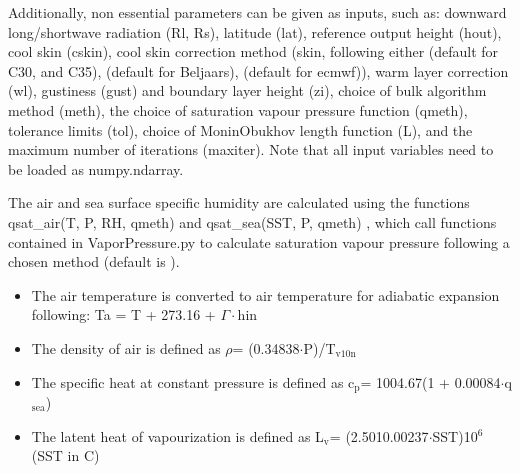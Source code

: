 \documentclass[letterpaper,10pt,english]{sphinxmanual}
\begin{document}
\sphinxAtStartPar
Additionally, non essential parameters can be given as inputs, such as: downward long/shortwave radiation (Rl, Rs), latitude (lat), reference output height (hout),  cool skin (cskin), cool skin correction method (skin, following either   (default for C30, and C35),  (default for Beljaars),  (default for ecmwf)), warm layer correction (wl), gustiness (gust) and boundary layer height (zi), choice of bulk algorithm method (meth), the choice of saturation vapour pressure function (qmeth), tolerance limits (tol), choice of Monin\sphinxhyphen{}Obukhov length function (L), and the maximum number of iterations (maxiter). Note that all input variables need to be loaded as numpy.ndarray.

\sphinxAtStartPar
The air and sea surface specific humidity are calculated using the functions qsat\_air(T, P, RH, qmeth) and qsat\_sea(SST, P, qmeth) , which call functions contained in VaporPressure.py to calculate saturation vapour pressure following a chosen method (default is ).
\begin{itemize}
\item {} 
\sphinxAtStartPar
The air temperature is converted to air temperature for adiabatic expansion following: Ta = T + 273.16 + \(\Gamma \cdot\)hin

\item {} 
\sphinxAtStartPar
The density of air is defined as \(\rho\)= (0.34838\(\cdot\)P)/T$_{\text{v10n}}$

\item {} 
\sphinxAtStartPar
The specific heat at constant pressure is defined  as c$_{\text{p}}$= 1004.67(1 + 0.00084\(\cdot\)q$_{\text{sea}}$)

\item {} 
\sphinxAtStartPar
The latent heat of vapourization is defined as L$_{\text{v}}$= (2.501\sphinxhyphen{}0.00237\(\cdot\)SST)10$^{\text{6}}$ (SST in C)

\end{itemize}
\end{document}
